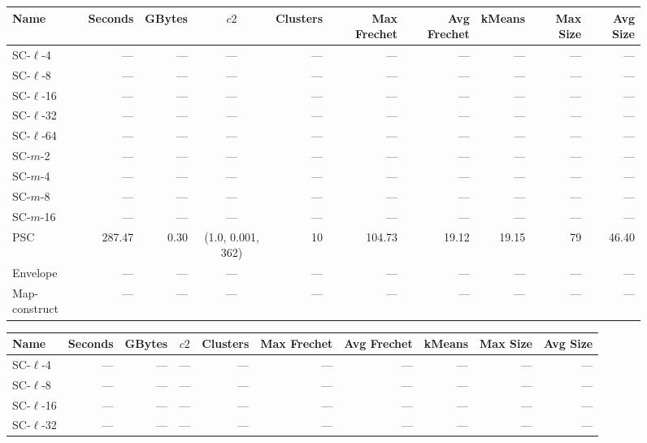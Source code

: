 
    \begin{figure} \begin{center}
        \begin{minipage}{\textwidth}
    {
    \begin{tabular}{@{}lrrcrrrrrr@{}}
        \toprule
        Name & Seconds & GBytes & $c2$ & Clusters & Max Frechet & Avg Frechet & kMeans & Max Size & Avg Size\\
        \midrule
        SC-$\ell$-4 & --- & --- & --- & --- & --- & --- & --- & --- & ---\\
SC-$\ell$-8 & --- & --- & --- & --- & --- & --- & --- & --- & ---\\
SC-$\ell$-16 & --- & --- & --- & --- & --- & --- & --- & --- & ---\\
SC-$\ell$-32& --- & --- & --- & --- & --- & --- & --- & --- & ---\\
SC-$\ell$-64 & --- & --- & --- & --- & --- & --- & --- & --- & ---\\
SC-$m$-2 & --- & --- & --- & --- & --- & --- & --- & --- & ---\\
SC-$m$-4 & --- & --- & --- & --- & --- & --- & --- & --- & ---\\
SC-$m$-8 & --- & --- & --- & --- & --- & --- & --- & --- & ---\\
SC-$m$-16 & --- & --- & --- & --- & --- & --- & --- & --- & ---\\
PSC & 287.47 & 0.30 & (1.0, 0.001, 362) & 10 & 104.73 & 19.12 & 19.15 & 79 & 46.40\\
Envelope & --- & --- & --- & --- & --- & --- & --- & --- & ---\\
Map-construct & --- & --- & --- & --- & --- & --- & --- & --- & ---\\
        \bottomrule
    \end{tabular}
    }
    {
    \begin{tabular}{@{}lrrcrrrrrr@{}}
        \toprule
        Name & Seconds & GBytes & $c2$ & Clusters & Max Frechet & Avg Frechet & kMeans & Max Size & Avg Size\\
        \midrule
        SC-$\ell$-4 & --- & --- & --- & --- & --- & --- & --- & --- & ---\\
SC-$\ell$-8 & --- & --- & --- & --- & --- & --- & --- & --- & ---\\
SC-$\ell$-16 & --- & --- & --- & --- & --- & --- & --- & --- & ---\\
SC-$\ell$-32 & --- & --- & --- & --- & --- & --- & --- & --- & ---\\

\end{tabular}}
\end{minipage}
\end{center}
\end{figure}

